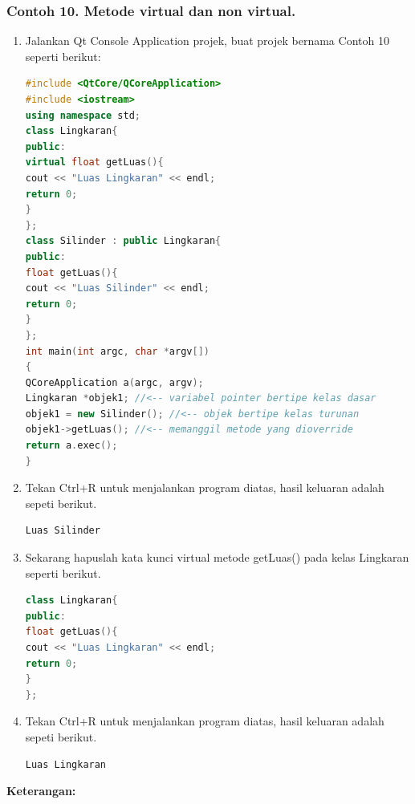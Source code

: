 \subsubsection*{Contoh 10. Metode virtual dan non virtual.}

\begin{enumerate}
\def\labelenumi{\arabic{enumi}.}
\item
  Jalankan Qt Console Application projek, buat projek bernama Contoh 10
  seperti berikut:

\begin{lstlisting}[language=c++]
#include <QtCore/QCoreApplication>
#include <iostream>
using namespace std;
class Lingkaran{
public:
virtual float getLuas(){
cout << "Luas Lingkaran" << endl;
return 0;
}
};
class Silinder : public Lingkaran{
public:
float getLuas(){
cout << "Luas Silinder" << endl;
return 0;
}
};
int main(int argc, char *argv[])
{
QCoreApplication a(argc, argv);
Lingkaran *objek1; //<-- variabel pointer bertipe kelas dasar
objek1 = new Silinder(); //<-- objek bertipe kelas turunan
objek1->getLuas(); //<-- memanggil metode yang dioverride
return a.exec();
}
\end{lstlisting}
\item
  Tekan Ctrl+R untuk menjalankan program diatas, hasil keluaran adalah
  sepeti berikut.

\begin{verbatim}
Luas Silinder
\end{verbatim} 
\item
  Sekarang hapuslah kata kunci virtual metode getLuas() pada kelas
  Lingkaran seperti berikut.

\begin{lstlisting}[language=c++]
class Lingkaran{
public:
float getLuas(){
cout << "Luas Lingkaran" << endl;
return 0;
}
};
\end{lstlisting}
\item
  Tekan Ctrl+R untuk menjalankan program diatas, hasil keluaran adalah
  sepeti berikut.


\begin{verbatim}
Luas Lingkaran
\end{verbatim} 
\end{enumerate}
\textbf{Keterangan:}


